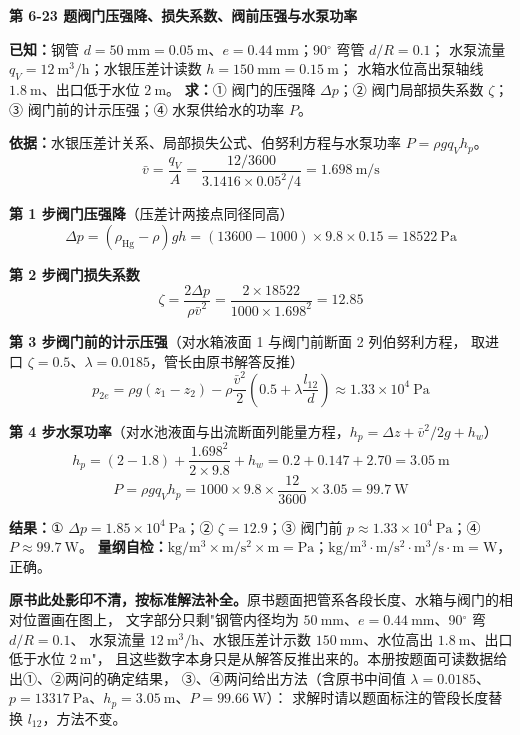\noindent\textbf{第 6-23 题\quad 阀门压强降、损失系数、阀前压强与水泵功率}

\begin{jie}
\textbf{已知：}钢管 $d=50\ \mathrm{mm}=0.05\ \mathrm{m}$、$e=0.44\ \mathrm{mm}$；90$^\circ$ 弯管 $d/R=0.1$；
水泵流量 $q_V=12\ \mathrm{m^3/h}$；水银压差计读数 $h=150\ \mathrm{mm}=0.15\ \mathrm{m}$；
水箱水位高出泵轴线 $1.8\ \mathrm{m}$、出口低于水位 $2\ \mathrm{m}$。
\textbf{求：}① 阀门的压强降 $\Delta p$；② 阀门局部损失系数 $\zeta$；③ 阀门前的计示压强；④ 水泵供给水的功率 $P$。

\textbf{依据：}水银压差计关系、局部损失公式、伯努利方程与水泵功率 $P=\rho g q_V h_p$。
\[ \bar v=\frac{q_V}{A}=\frac{12/3600}{3.1416\times0.05^2/4}=1.698\ \mathrm{m/s} \]

\textbf{第 1 步\quad 阀门压强降}（压差计两接点同径同高）
\[ \Delta p=(\rho_{\text{Hg}}-\rho)gh=(13600-1000)\times9.8\times0.15=18522\ \mathrm{Pa} \]

\textbf{第 2 步\quad 阀门损失系数}
\[ \zeta=\frac{2\Delta p}{\rho\bar v^2}=\frac{2\times18522}{1000\times1.698^2}=12.85 \]

\textbf{第 3 步\quad 阀门前的计示压强}（对水箱液面 1 与阀门前断面 2 列伯努利方程，
取进口 $\zeta=0.5$、$\lambda=0.0185$，管长由原书解答反推）
\[ p_{2e}=\rho g(z_1-z_2)-\rho\frac{\bar v^2}{2}\left(0.5+\lambda\frac{l_{12}}{d}\right)\approx1.33\times10^4\ \mathrm{Pa} \]

\textbf{第 4 步\quad 水泵功率}（对水池液面与出流断面列能量方程，$h_p=\Delta z+\bar v^2/2g+h_w$）
\[ h_p=(2-1.8)+\frac{1.698^2}{2\times9.8}+h_w=0.2+0.147+2.70=3.05\ \mathrm{m} \]
\[ P=\rho g q_Vh_p=1000\times9.8\times\frac{12}{3600}\times3.05=99.7\ \mathrm{W} \]

\textbf{结果：}① $\Delta p=1.85\times10^4\ \mathrm{Pa}$；② $\zeta=12.9$；③ 阀门前 $p\approx1.33\times10^4\ \mathrm{Pa}$；④ $P\approx99.7\ \mathrm{W}$。
\textbf{量纲自检：}$\mathrm{kg/m^3\times m/s^2\times m}=\mathrm{Pa}$；$\mathrm{kg/m^3\cdot m/s^2\cdot m^3/s\cdot m}=\mathrm{W}$，正确。
\end{jie}

\begin{tishi}
\textbf{原书此处影印不清，按标准解法补全。}原书题面把管系各段长度、水箱与阀门的相对位置画在图上，
文字部分只剩"钢管内径均为 $50\ \mathrm{mm}$、$e=0.44\ \mathrm{mm}$、90$^\circ$ 弯 $d/R=0.1$、
水泵流量 $12\ \mathrm{m^3/h}$、水银压差计示数 $150\ \mathrm{mm}$、水位高出 $1.8\ \mathrm{m}$、出口低于水位 $2\ \mathrm{m}$"，
且这些数字本身只是从解答反推出来的。本册按题面可读数据给出①、②两问的确定结果，
③、④两问给出方法（含原书中间值 $\lambda=0.0185$、$p=13317\ \mathrm{Pa}$、$h_p=3.05\ \mathrm{m}$、$P=99.66\ \mathrm{W}$）：
求解时请以题面标注的管段长度替换 $l_{12}$，方法不变。
\end{tishi}

